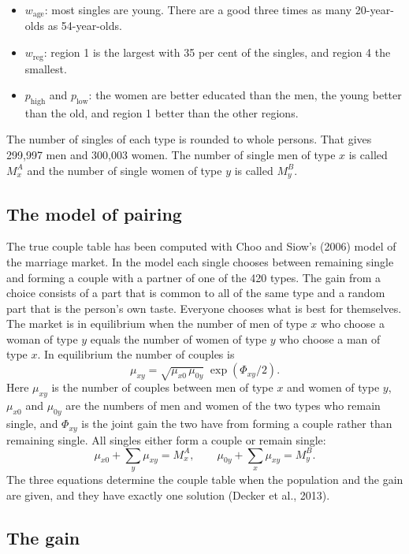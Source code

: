 \documentclass[12pt,a4paper]{article}
\begin{document}
\begin{itemize}
\item $w_{\text{age}}$: most singles are young. There are a good three times as many 20-year-olds
as 54-year-olds.
\item $w_{\text{reg}}$: region 1 is the largest with 35 per cent of the singles, and region 4 the
smallest.
\item $p_{\text{high}}$ and $p_{\text{low}}$: the women are better educated than the men, the young
better than the old, and region 1 better than the other regions.
\end{itemize}

The number of singles of each type is rounded to whole persons. That gives 299,997 men and 300,003
women. The number of single men of type $x$ is called $M^A_x$ and the number of single women of
type $y$ is called $M^B_y$.

\subsection{The model of pairing}

The true couple table has been computed with Choo and Siow's (2006) model of the marriage market.
In the model each single chooses between remaining single and forming a couple with a partner of
one of the 420 types. The gain from a choice consists of a part that is common to all of the same
type and a random part that is the person's own taste. Everyone chooses what is best for
themselves. The market is in equilibrium when the number of men of type $x$ who choose a woman of
type $y$ equals the number of women of type $y$ who choose a man of type $x$. In equilibrium the
number of couples is
\[
\mu_{xy}=\sqrt{\mu_{x0}\,\mu_{0y}}\;\exp(\Phi_{xy}/2) .
\]
Here $\mu_{xy}$ is the number of couples between men of type $x$ and women of type $y$, $\mu_{x0}$
and $\mu_{0y}$ are the numbers of men and women of the two types who remain single, and $\Phi_{xy}$
is the joint gain the two have from forming a couple rather than remaining single. All singles
either form a couple or remain single:
\[
\mu_{x0}+\sum_y\mu_{xy}=M^A_x, \qquad \mu_{0y}+\sum_x\mu_{xy}=M^B_y .
\]
The three equations determine the couple table when the population and the gain are given, and they
have exactly one solution (Decker et al., 2013).

\subsection{The gain}
\end{document}
